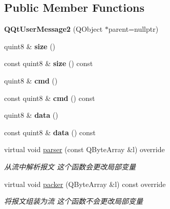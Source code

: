 \subsection*{Public Member Functions}
\begin{DoxyCompactItemize}
\item 
\mbox{\label{class_q_qt_user_message2_a65e53e6276bff59d25235cc76a4aa35f}} 
{\bfseries Q\+Qt\+User\+Message2} (Q\+Object $\ast$parent=nullptr)
\item 
\mbox{\label{class_q_qt_user_message2_a3dbea515d92f50b4d3e6b94d8ed5294d}} 
quint8 \& {\bfseries size} ()
\item 
\mbox{\label{class_q_qt_user_message2_abcf3de62978503e876f34c9f3d080833}} 
const quint8 \& {\bfseries size} () const
\item 
\mbox{\label{class_q_qt_user_message2_a34d9f1d2d6cc30be38fddfb1ef4c21c6}} 
quint8 \& {\bfseries cmd} ()
\item 
\mbox{\label{class_q_qt_user_message2_a0c8b2982fe4a14852a035974c99c8524}} 
const quint8 \& {\bfseries cmd} () const
\item 
\mbox{\label{class_q_qt_user_message2_af89a77c34edca8a927d81f6a6f506346}} 
quint8 \& {\bfseries data} ()
\item 
\mbox{\label{class_q_qt_user_message2_a70018bb2109da17a03e6c2dc649e3db4}} 
const quint8 \& {\bfseries data} () const
\item 
virtual void \mbox{\hyperlink{class_q_qt_user_message2_a4b39c77bf87a9c676326c062cb64e9fa}{parser}} (const Q\+Byte\+Array \&l) override
\begin{DoxyCompactList}\small\item\em 从流中解析报文 这个函数会更改局部变量 \end{DoxyCompactList}\item 
virtual void \mbox{\hyperlink{class_q_qt_user_message2_a11bf04e6af5533c01b88445826019406}{packer}} (Q\+Byte\+Array \&l) const override
\begin{DoxyCompactList}\small\item\em 将报文组装为流 这个函数不会更改局部变量 \end{DoxyCompactList}\end{DoxyCompactItemize}


